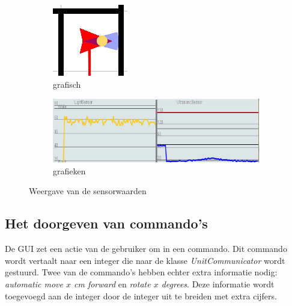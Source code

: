 \documentclass[tt3]{penoverslag}
\begin{document}
\begin{figure}
        \centering
        \begin{subfigure}[hb]{0.25\textwidth}
                \centering
                \includegraphics[width=\textwidth]{guiRobot}
                \caption{grafisch}
        \end{subfigure}%
        \begin{subfigure}[hb]{0.75\textwidth}
                \centering
                \includegraphics[width=\textwidth]{guiSensor}
                \caption{grafieken}
        \end{subfigure}
 \caption{Weergave van de sensorwaarden}
\label{fig:guiSensoren}
\end{figure}

\subsection{Het doorgeven van commando's} %
\label{ssec:commands}
De GUI zet een actie van de gebruiker om in een commando. Dit commando wordt vertaalt naar een integer die naar de klasse \textit{UnitCommunicator} wordt gestuurd. Twee van de commando's hebben echter extra informatie nodig: \textit{automatic move $x$ cm forward} en \textit{rotate $x$ degrees}. Deze informatie wordt toegevoegd aan de integer door de integer uit te breiden met extra cijfers.\\
\end{document}
